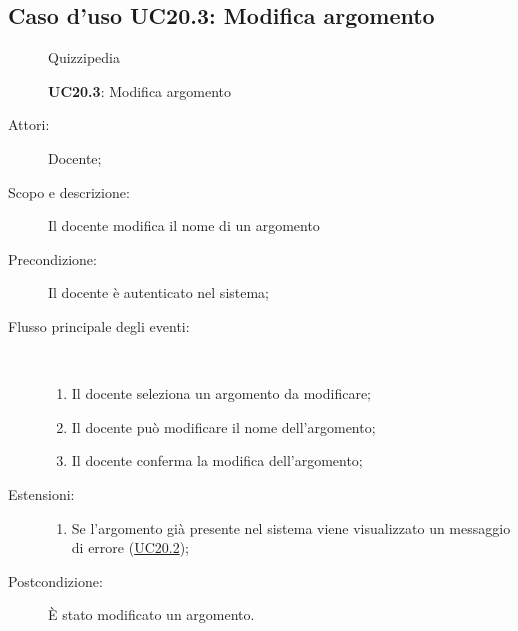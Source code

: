 \subsection{Caso d'uso UC20.3: Modifica argomento}
\begin{figure}[H]
	\centering
	\begin{resizedtikzpicture}{\textwidth}
		\begin{umlsystem}[x=0, fill=lightgray!20]{Quizzipedia}
		\end{umlsystem}
	\end{resizedtikzpicture}
	\caption{\textbf{UC20.3}: Modifica argomento}
	\label{UC20.3}
\end{figure}
\begin{description}
	\item[Attori:] Docente;
	\item[Scopo e descrizione:] Il docente modifica il nome di un argomento
	\item[Precondizione:] Il docente è autenticato nel sistema;
	
	\item[Flusso principale degli eventi:] \ 
	\begin{enumerate}
		\item Il docente seleziona un argomento da modificare;
		\item Il docente può modificare il nome dell'argomento;
		\item Il docente conferma la modifica dell'argomento;
		
	\end{enumerate}
	\item[Estensioni:]
	\begin{enumerate}
		\item Se l'argomento già presente nel sistema viene visualizzato un messaggio di errore (\hyperlink{UC20.2}{UC20.2});
		
	\end{enumerate}
	\item[Postcondizione:] È stato modificato un argomento.
\end{description}
\hypertarget{UC20.4}{}
